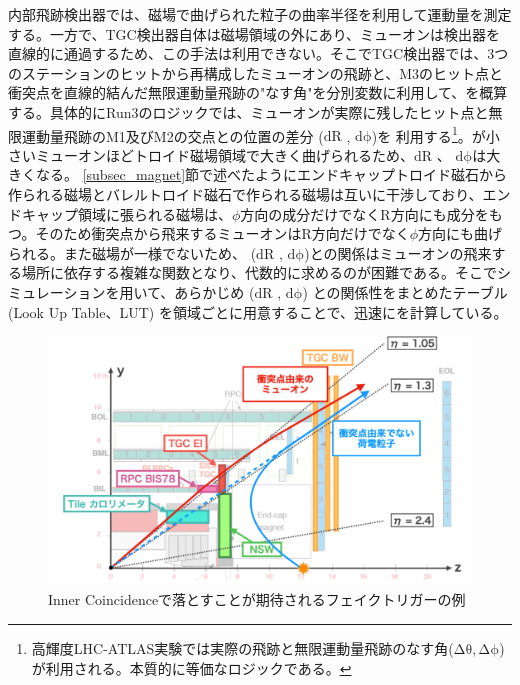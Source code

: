内部飛跡検出器では、磁場で曲げられた粒子の曲率半径を利用して運動量を測定する。一方で、TGC検出器自体は磁場領域の外にあり、ミューオンは検出器を直線的に通過するため、この手法は利用できない。そこでTGC検出器では、3つのステーションのヒットから再構成したミューオンの飛跡と、M3のヒット点と衝突点を直線的結んだ無限運動量飛跡の"なす角"を分別変数に利用して、\pt を概算する。具体的にRun3のロジックでは、ミューオンが実際に残したヒット点と無限運動量飛跡のM1及びM2の交点との位置の差分  ($\mathrm{dR}$ , $\mathrm{d\phi}$)を 利用する\footnote{高輝度LHC-ATLAS実験では実際の飛跡と無限運動量飛跡のなす角($\mathrm{\Delta\theta, \Delta\phi}$)が利用される。本質的に等価なロジックである。}。\pt が小さいミューオンほどトロイド磁場領域で大きく曲げられるため、$\mathrm{dR}$ 、 $\mathrm{d\phi}$は大きくなる。
\ref{subsec_magnet}節で述べたようにエンドキャップトロイド磁石から作られる磁場とバレルトロイド磁石で作られる磁場は互いに干渉しており、エンドキャップ領域に張られる磁場は、$\phi$方向の成分だけでなくR方向にも成分をもつ。そのため衝突点から飛来するミューオンはR方向だけでなく$\phi$方向にも曲げられる。また磁場が一様でないため、 ($\mathrm{dR}$ , $\mathrm{d\phi}$)と\pt の関係はミューオンの飛来する場所に依存する複雑な関数となり、代数的に求めるのが困難である。そこでシミュレーションを用いて、あらかじめ  ($\mathrm{dR}$ , $\mathrm{d\phi}$) と\pt の関係性をまとめたテーブル  (Look Up Table、LUT) を領域ごとに用意することで、迅速に\pt を計算している。

\begin{figure} 
\centering
\includegraphics[width=16cm]{fig/Intro/TGC_Inner_concept.png}
\caption[フェイクトリガーの例]{Inner Coincidenceで落とすことが期待されるフェイクトリガーの例\cite{mt_kawamoto}}

\label{TGC_Inner_concept}
\end{figure}

